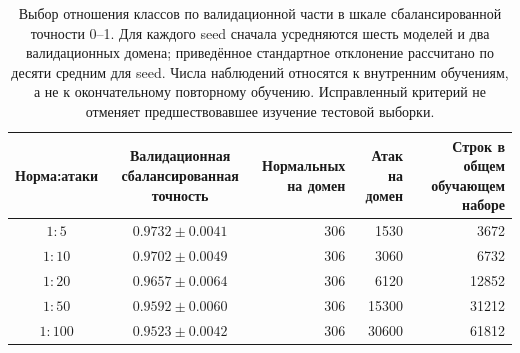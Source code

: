 \begin{table}[t]
\centering
\caption{Выбор отношения классов по валидационной части в шкале сбалансированной точности 0--1. Для каждого seed сначала усредняются шесть моделей и два валидационных домена; приведённое стандартное отклонение рассчитано по десяти средним для seed. Числа наблюдений относятся к внутренним обучениям, а не к окончательному повторному обучению. Исправленный критерий не отменяет предшествовавшее изучение тестовой выборки.}
\label{tab:supp-ratio-selection}
\footnotesize
\setlength{\tabcolsep}{4pt}
\begin{tabular}{ccrrr}
\toprule
Норма:атаки & \shortstack{Валидационная\\сбалансированная точность} & \shortstack{Нормальных\\на домен} & \shortstack{Атак\\на домен} & \shortstack{Строк в общем\\обучающем наборе} \\
\midrule
$1:5$ & $0.9732 \pm 0.0041$ & 306 & 1530 & 3672 \\
$1:10$ & $0.9702 \pm 0.0049$ & 306 & 3060 & 6732 \\
$1:20$ & $0.9657 \pm 0.0064$ & 306 & 6120 & 12852 \\
$1:50$ & $0.9592 \pm 0.0060$ & 306 & 15300 & 31212 \\
$1:100$ & $0.9523 \pm 0.0042$ & 306 & 30600 & 61812 \\
\bottomrule
\end{tabular}
\end{table}

